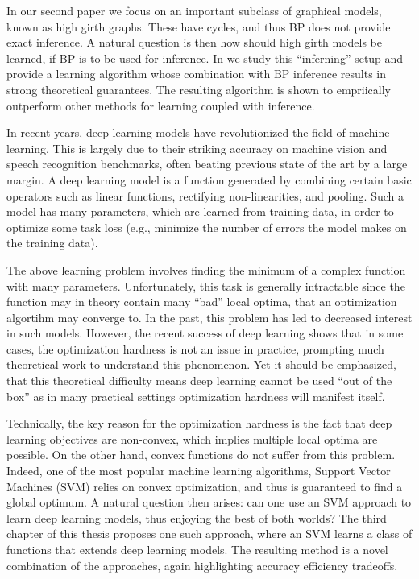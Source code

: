 In our second paper \cite{heinemann2014inferning} we focus on an important subclass of graphical models, known as high girth graphs. These have cycles, and thus BP does not provide exact inference. A natural question is then how should high girth models be learned, if BP is to be used for inference. In  \cite{heinemann2014inferning} we study this ``inferning'' setup and provide a learning algorithm whose combination with BP inference results in strong theoretical guarantees. The resulting algorithm is shown to empriically outperform other methods for learning coupled with inference.

In recent years, deep-learning models have revolutionized the field of machine learning. This is largely due to their striking accuracy on machine vision \cite{krizhevsky2012imagenet} and speech recognition \cite{mohamed2009deep, hinton2012deep} benchmarks, often beating previous state of the art by a large margin. A deep learning model is a function generated by combining certain basic operators such as linear functions, rectifying non-linearities, and pooling.
 Such a model has many parameters, which are learned from training data, in order to optimize some task loss (e.g., minimize the number of errors the model makes on the training data). 

The above learning problem involves finding the minimum of a complex
function with many parameters. Unfortunately, this task is generally
intractable  since the function may in theory contain many
``bad'' local optima, that an optimization algortihm may converge
to. In the past, this problem has led to decreased interest in such
models. However, the recent success of deep learning shows that in
some cases, the optimization hardness is not an issue in practice,
prompting much theoretical work to understand this phenomenon. Yet it
should be emphasized, that this theoretical difficulty means deep
learning cannot be used ``out of the box'' as in many practical
settings optimization hardness will manifest itself.

Technically, the key reason for the optimization hardness is the fact that 
deep learning objectives are non-convex, which implies multiple local optima are possible. On the other hand, convex functions do not suffer from this problem. Indeed, one of the most popular machine learning algorithms, Support Vector Machines (SVM) relies on convex optimization, and thus is guaranteed to find a global optimum. A natural question then arises: can one use an SVM approach to learn deep learning models, thus enjoying the best of both worlds? The third chapter of this thesis proposes one such approach, where an SVM learns a class of functions that extends deep learning models. The resulting method is a novel combination of the approaches, again highlighting accuracy efficiency tradeoffs. 


